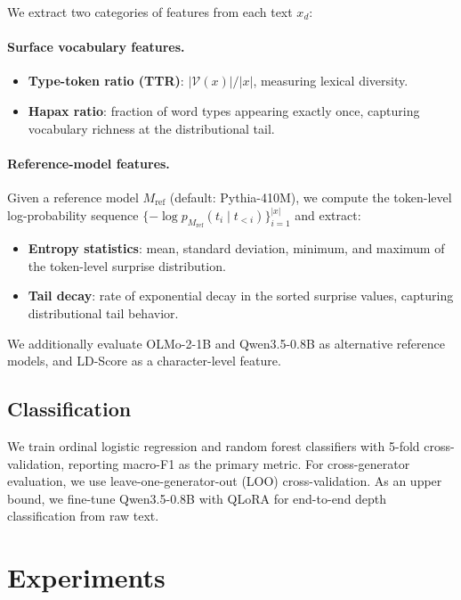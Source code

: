 \documentclass[letterpaper]{article}
\begin{document}
We extract two categories of features from each text $x_d$:

\paragraph{Surface vocabulary features.}
\begin{itemize}[nosep,leftmargin=*]
    \item \textbf{Type-token ratio (TTR)}: $|\mathcal{V}(x)| / |x|$, measuring lexical diversity.
    \item \textbf{Hapax ratio}: fraction of word types appearing exactly once, capturing vocabulary richness at the distributional tail.
\end{itemize}

\paragraph{Reference-model features.}
Given a reference model $M_\text{ref}$ (default: Pythia-410M), we compute the token-level log-probability sequence $\{-\log p_{M_\text{ref}}(t_i \mid t_{<i})\}_{i=1}^{|x|}$ and extract:
\begin{itemize}[nosep,leftmargin=*]
    \item \textbf{Entropy statistics}: mean, standard deviation, minimum, and maximum of the token-level surprise distribution.
    \item \textbf{Tail decay}: rate of exponential decay in the sorted surprise values, capturing distributional tail behavior.
\end{itemize}

We additionally evaluate OLMo-2-1B and Qwen3.5-0.8B as alternative reference models, and LD-Score \citep{tulchinskii2024ldscore} as a character-level feature.

\subsection{Classification}
\label{sec:classifiers}

We train ordinal logistic regression and random forest classifiers with 5-fold cross-validation, reporting macro-F1 as the primary metric. For cross-generator evaluation, we use leave-one-generator-out (LOO) cross-validation. As an upper bound, we fine-tune Qwen3.5-0.8B with QLoRA for end-to-end depth classification from raw text.

\section{Experiments}
\label{sec:experiments}
\end{document}
